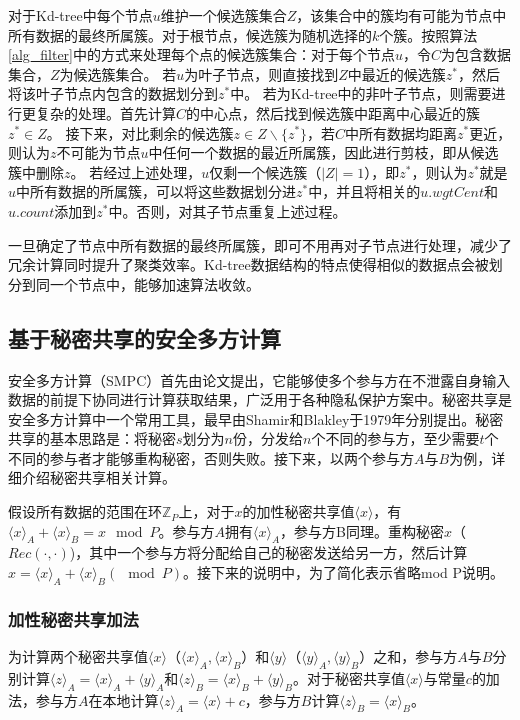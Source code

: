 对于Kd-tree中每个节点$ u $维护一个候选簇集合$ Z $，该集合中的簇均有可能为节点中所有数据的最终所属簇。对于根节点，候选簇为随机选择的$ k $个簇。按照算法\ref{alg_filter}中的方式来处理每个点的候选簇集合：对于每个节点$ u $，令$ C $为包含数据集合，$ Z $为候选簇集合。
若$ u $为叶子节点，则直接找到$ Z $中最近的候选簇$ z^* $，然后将该叶子节点内包含的数据划分到$ z^* $中。
若为Kd-tree中的非叶子节点，则需要进行更复杂的处理。首先计算$ C $的中心点，然后找到候选簇中距离中心最近的簇$ z^*\in Z $。
接下来，对比剩余的候选簇$ z\in Z\backslash\{z^*\} $，若$ C $中所有数据均距离$ z^* $更近，则认为$ z $不可能为节点$ u $中任何一个数据的最近所属簇，因此进行剪枝，即从候选簇中删除$ z $。
若经过上述处理，$ u $仅剩一个候选簇（$ |Z|=1 $），即$ z^* $，则认为$ z^* $就是$ u $中所有数据的所属簇，可以将这些数据划分进$ z^* $中，并且将相关的$ u.wgtCent $和$ u.count $添加到$ z^* $中。否则，对其子节点重复上述过程。

一旦确定了节点中所有数据的最终所属簇，即可不用再对子节点进行处理，减少了冗余计算同时提升了聚类效率。Kd-tree数据结构的特点使得相似的数据点会被划分到同一个节点中，能够加速算法收敛。

\subsection{基于秘密共享的安全多方计算}
安全多方计算（SMPC）首先由论文\cite{yao1986generate}提出，它能够使多个参与方在不泄露自身输入数据的前提下协同进行计算获取结果，广泛用于各种隐私保护方案中。秘密共享是安全多方计算中一个常用工具，最早由Shamir\cite{rivest2001leak}和Blakley\cite{blakley1979safeguarding}于1979年分别提出。秘密共享的基本思路是：将秘密$ s $划分为$ n $份，分发给$ n $个不同的参与方，至少需要$ t $个不同的参与者才能够重构秘密，否则失败。接下来，以两个参与方$ A $与$ B $为例，详细介绍秘密共享相关计算。

假设所有数据的范围在环$ \mathbb{Z}_P $上，对于$ x $的加性秘密共享值$ \langle x \rangle $，有$ \langle x \rangle_A + \langle x \rangle_B = x\mod P$。参与方$ A $拥有$ \langle x \rangle_A $，参与方B同理。重构秘密$ x $（$ Rec(\cdot, \cdot) $)，其中一个参与方将分配给自己的秘密发送给另一方，然后计算$ x=\langle x\rangle_A+\langle x\rangle_B(\mod P) $。接下来的说明中，为了简化表示省略mod P说明。

\subsubsection{加性秘密共享加法}
为计算两个秘密共享值$ \langle x \rangle $（$ \langle x \rangle_A,\langle x \rangle_B $）和$ \langle y \rangle $（$ \langle y\rangle_A,\langle y\rangle_B $）之和，参与方$ A $与$ B $分别计算$\langle z\rangle_A=\langle x\rangle_A+\langle y\rangle_A$和$\langle z\rangle_B=\langle x\rangle_B+\langle y\rangle_B$。对于秘密共享值$ \langle x \rangle $与常量$ c $的加法，参与方$ A $在本地计算$\langle z\rangle_A=\langle x\rangle+c$，参与方$ B $计算$\langle z\rangle_B=\langle x\rangle_B$。
